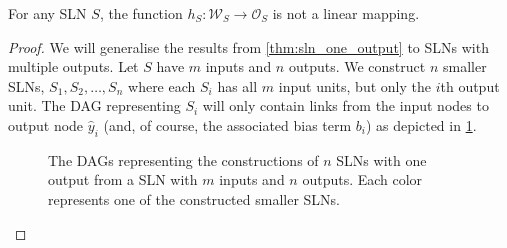 \begin{corollary}
    \label{col:weight_output_sln}
    For any SLN $S$, the function $h_S: \mathcal{W}_S \rightarrow \mathcal{O}_S$ is not a linear mapping.
\end{corollary}
\begin{proof}
    We will generalise the results from \ref{thm:sln_one_output} to SLNs with multiple outputs.
    Let $S$ have $m$ inputs and $n$ outputs.
    We construct $n$ smaller SLNs, $S_1,S_2,\dots,S_n$ where each $S_i$ has all $m$ input units, but only the $i$th output unit. 
    The DAG representing $S_i$ will only contain links from the input nodes to output node $\hat{y}_i$ (and, of course, the associated bias term $b_i$) as depicted in \ref{fig:sln_m_in_n_out_construction}.
    \begin{figure}
        \begin{center}
        \end{center}
        \caption{The DAGs representing the constructions of $n$ SLNs with one output from a SLN with $m$ inputs and $n$ outputs. Each color represents one of the constructed smaller SLNs.}
        \label{fig:sln_m_in_n_out_construction}
    \end{figure}
    

\end{proof}
